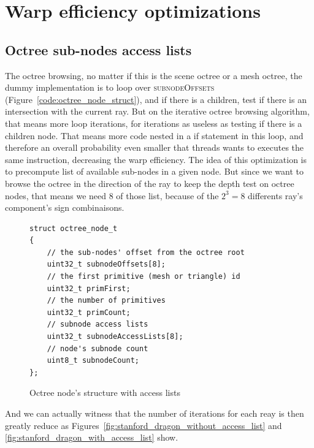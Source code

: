 \documentclass[10pt,twocolumn,a4paper]{article}
\begin{document}
\section{Warp efficiency optimizations}
\subsection{Octree sub-nodes access lists}
The octree browsing, no matter if this is the scene octree or a mesh octree,
the dummy implementation is to loop over \textsc{subnodeOffsets}
(Figure~\ref{code:octree_node_struct}), and if there is a children, test if
there is an intersection with the current ray. But on the iterative octree
browsing algorithm, that means more loop iterations, for iterations as useless
as testing if there is a children node. That means more code nested in a if
statement in this loop, and therefore an overall probability even smaller that
threads wants to executes the same instruction, decreasing the warp efficiency.
The idea of this optimization is to precompute list of available sub-nodes in
a given node. But since we want to browse the octree in the direction of the
ray to keep the depth test on octree nodes, that means we need 8 of those list,
because of the $2^3 = 8$ differents ray's component's sign combinaisons.

\begin{figure}[H]
    \centering
    \begin{lstlisting}[morekeywords={uint8_t,uint32_t}]
struct octree_node_t
{
    // the sub-nodes' offset from the octree root
    uint32_t subnodeOffsets[8];
    // the first primitive (mesh or triangle) id
    uint32_t primFirst;
    // the number of primitives
    uint32_t primCount;
    // subnode access lists
    uint32_t subnodeAccessLists[8];
    // node's subnode count
    uint8_t subnodeCount;
};
    \end{lstlisting}
    \caption{Octree node's structure with access lists}
    \label{code:subnode_access_struct}
\end{figure}

And we can actually witness that the number of iterations for each reay is
then greatly reduce as Figures~\ref{fig:stanford_dragon_without_access_list} and
\ref{fig:stanford_dragon_with_access_list} show.
\end{document}

